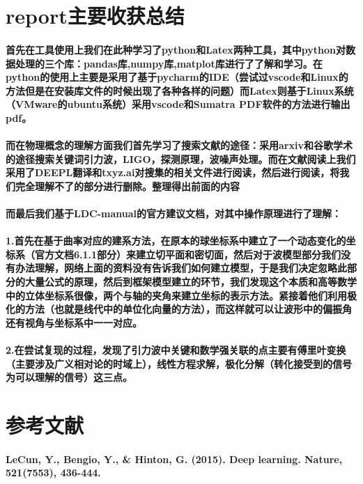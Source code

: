 \documentclass{article}
\begin{document}
\section{report主要收获总结}
\paragraph{首先在工具使用上我们在此种学习了python和Latex两种工具，其中python对数据处理的三个库：pandas库,numpy库,matplot库进行了了解和学习。在python的使用上主要是采用了基于pycharm的IDE（尝试过vscode和Linux的方法但是在安装库文件的时候出现了各种各样的问题）而Latex则基于Linux系统（VMware的ubuntu系统）采用vscode和Sumatra PDF软件的方法进行输出pdf。}
\paragraph{而在物理概念的理解方面我们首先学习了搜索文献的途径：采用arxiv和谷歌学术的途径搜索关键词引力波，LIGO，探测原理，波噪声处理。而在文献阅读上我们采用了DEEPL翻译和txyz.ai对搜集的相关文件进行阅读，然后进行阅读，将我们完全理解不了的部分进行删除。整理得出前面的内容}
\paragraph{而最后我们基于LDC-manual的官方建议文档，对其中操作原理进行了理解：}
\paragraph{1.首先在基于曲率对应的建系方法，在原本的球坐标系中建立了一个动态变化的坐标系（官方文档6.1.1部分）来建立切平面和密切面，然后对于波模型部分我们没有办法理解，网络上面的资料没有告诉我们如何建立模型，于是我们决定忽略此部分的大量公式的原理，然后到框架模型建立的环节，我们发现这个本质和高等数学中的立体坐标系很像，两个与轴的夹角来建立坐标的表示方法。紧接着他们利用极化的方法（也就是线代中的单位化向量的方法），而这样就可以让波形中的偏振角还有视角与坐标系中一一对应。}
\paragraph{2.在尝试复现的过程，发现了引力波中关键和数学强关联的点主要有傅里叶变换（主要涉及广义相对论的时域上），线性方程求解，极化分解（转化接受到的信号为可以理解的信号）这三点。}
\section{参考文献}
\paragraph{LeCun, Y., Bengio, Y., & Hinton, G. (2015). Deep learning. Nature, 521(7553), 436-444.}
\end{document}
